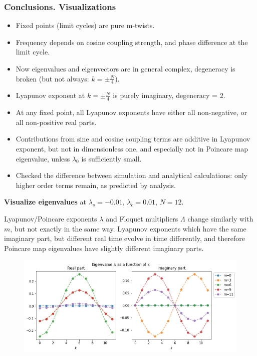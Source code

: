 \documentclass[a4paper,10pt]{article}
\begin{document}
\subsubsection{Conclusions. Visualizations}

\begin{itemize}
\item Fixed points (limit cycles) are pure m-twists.
\item Frequency depends on cosine coupling strength, and phase difference at the limit cycle.
\item Now eigenvalues and eigenvectors are in general complex, degeneracy is broken (but not always: $k=\pm \frac{N}{4}$).
\item Lyapunov exponent at $k=\pm\frac{N}{4}$  is purely imaginary, degeneracy = 2.
\item At any fixed point, all Lyapunov exponents have either all non-negative, or all non-positive real parts.
\item Contributions from sine and cosine coupling terms are additive in Lyapunov exponent, but not in dimensionless one, and especially not in Poincare map eigenvalue, unless $\lambda_0$ is sufficiently small. 
\item Checked the difference between simulation and analytical calculations: only higher order terms remain, as predicted by analysis.
\end{itemize}

\textbf{Visualize eigenvalues} at 
$\lambda_s = - 0.01$, $\lambda_c = 0.01$, $N=12$.

Lyapunov/Poincare exponents $\lambda$ and Floquet multipliers $\Lambda$ change similarly with $m$, but not exactly in the same way. Lyapunov exponents which have the same imaginary part, but different real time evolve in time differently, and therefore Poincare map eigenvalues have slightly different imaginary parts.

\begin{figure}[h]
    \centering
    \includegraphics[width=.95\textwidth]{assets/theory-2019-09-06-173919422-458.png}
\end{figure}
\end{document}
